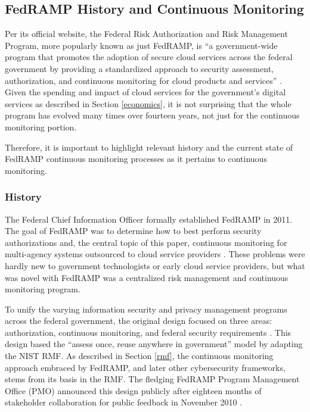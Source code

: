 \documentclass{jdf}
\begin{document}
\subsection{FedRAMP History and Continuous Monitoring}

Per its official website, the Federal Risk Authorization and Risk Management Program, more popularly known as just FedRAMP, is ``a government-wide program that promotes the adoption of secure cloud services across the federal government by providing a standardized approach to security assessment, authorization, and continuous monitoring for cloud products and services'' \citeyear{fedramp_definition25}. Given the spending and impact of cloud services for the government's digital services as described in Section \ref{economics}, it is not surprising that the whole program has evolved many times over fourteen years, not just for the continuous monitoring portion.

Therefore, it is important to highlight relevant history and the current state of FedRAMP continuous monitoring processes as it pertains to continuous monitoring.

\subsubsection{History} \label{fedramp_history}

The Federal Chief Information Officer formally established FedRAMP in 2011. The goal of FedRAMP was to determine how to best perform security authorizations and, the central topic of this paper, continuous monitoring for multi-agency systems outsourced to cloud service providers \cite[p.~239]{metheny17}. These problems were hardly new to government technologists or early cloud service providers, but what was novel with FedRAMP was a centralized risk management and continuous monitoring program.

To unify the varying information security and privacy management programs across the federal government, the original design focused on three areas: authorization, continuous monitoring, and federal security requirements \cite[p.~240]{metheny17}. This design based the ``assess once, reuse anywhere in government'' model by adapting the NIST RMF. As described in Section \ref{rmf}, the continuous monitoring approach embraced by FedRAMP, and later other cybersecurity frameworks, stems from its basis in the RMF. The fledging FedRAMP Program Management Office (PMO) announced this design publicly after eighteen months of stakeholder collaboration for public feedback in November 2010 \cite[p.~240]{metheny17}.
\end{document}
